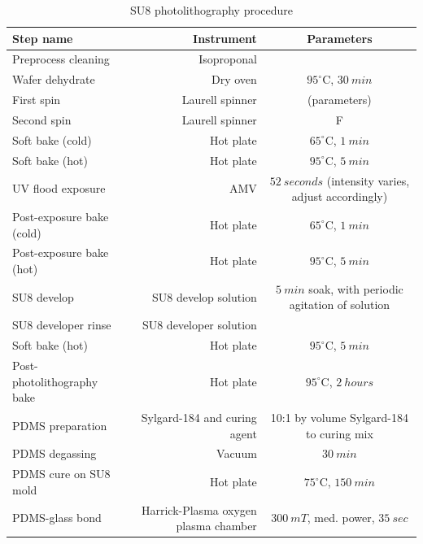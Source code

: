 			\begin{table}
				\begin{center}
				    \begin{tabular}{lrc}\hline
						Step name & Instrument & Parameters \\
						\hline
						Preprocess cleaning & Isoproponal & \\
						Wafer dehydrate & Dry oven & $95^{\circ}$C, $\SI{30}{min}$ \\
						First spin & Laurell spinner & (parameters) \\
						Second spin & Laurell spinner & F \\ \hline
						Soft bake (cold) & Hot plate & $65^{\circ}$C, $\SI{1}{min}$ \\
						Soft bake (hot) & Hot plate & $95^{\circ}$C, $\SI{5}{min}$ \\
						UV flood exposure & AMV & $\SI{52}{seconds}$ (intensity varies, adjust accordingly) \\
						Post-exposure bake (cold) & Hot plate & $65^{\circ}$C, $\SI{1}{min}$ \\
						Post-exposure bake (hot) & Hot plate & $95^{\circ}$C, $\SI{5}{min}$ \\
						SU8 develop & SU8 develop solution & $\SI{5}{min}$ soak, with periodic agitation of solution \\
						SU8 developer rinse & SU8 developer solution & \\Soft bake (hot) & Hot plate & $95^{\circ}$C, $\SI{5}{min}$ \\
						Post-photolithography bake & Hot plate & $95^{\circ}$C, $\SI{2}{hours}$ \\
						\hline
						PDMS preparation & Sylgard-184 and curing agent & 10:1 by volume Sylgard-184 to curing mix \\
						PDMS degassing & Vacuum & $\SI{30}{min}$ \\
						PDMS cure on SU8 mold & Hot plate & $75^{\circ}$C, $\SI{150}{min}$ \\
						PDMS-glass bond & Harrick-Plasma oxygen plasma chamber & $\SI{300}{mT}$, med. power, $\SI{35}{sec}$    
				    \end{tabular}
				    \caption{SU8 photolithography procedure} \label{tab:devicefab}
				\end{center}
			\end{table}
			
			
			
			
			
